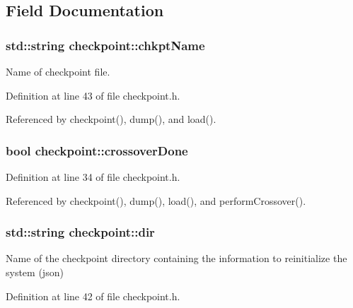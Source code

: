 \subsection{Field Documentation}
\hypertarget{classcheckpoint_a477eea21621f066889660ed426dc800f}{
\subsubsection[{chkpt\-Name}]{\setlength{\rightskip}{0pt plus 5cm}std\-::string checkpoint\-::chkpt\-Name}}\label{classcheckpoint_a477eea21621f066889660ed426dc800f}


Name of checkpoint file. 



Definition at line 43 of file checkpoint.\-h.



Referenced by checkpoint(), dump(), and load().

\hypertarget{classcheckpoint_a4f13612ea6d376bb327295bfce3a70c5}{
\subsubsection[{crossover\-Done}]{\setlength{\rightskip}{0pt plus 5cm}bool checkpoint\-::crossover\-Done}}\label{classcheckpoint_a4f13612ea6d376bb327295bfce3a70c5}


Definition at line 34 of file checkpoint.\-h.



Referenced by checkpoint(), dump(), load(), and perform\-Crossover().

\hypertarget{classcheckpoint_a0e0f999ee8e0b09541e9131baa8a591d}{
\subsubsection[{dir}]{\setlength{\rightskip}{0pt plus 5cm}std\-::string checkpoint\-::dir}}\label{classcheckpoint_a0e0f999ee8e0b09541e9131baa8a591d}


Name of the checkpoint directory containing the information to reinitialize the system (json) 



Definition at line 42 of file checkpoint.\-h.



